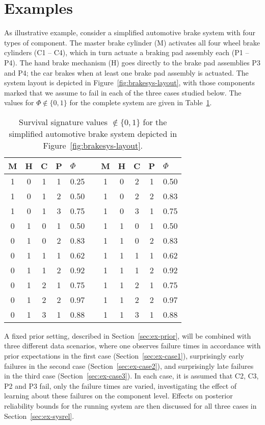 \documentclass[Journal,SectionNumbers,InsideFigs]{ascelike}
\begin{document}
\section{Examples}
\label{sec:examples}

As illustrative example, consider a simplified automotive brake system with four types of component.
The master brake cylinder (M) activates all four wheel brake cylinders (C1 -- C4),
which in turn actuate a braking pad assembly each (P1 -- P4).
The hand brake mechanism (H) goes directly to the brake pad assemblies P3 and P4;
the car brakes when at least one brake pad assembly is actuated.
The system layout is depicted in Figure~\ref{fig:brakesys-layout},
with those components marked that we assume to fail in each of the three cases studied below.
The values for $\Phi \not\in \{0,1\}$ for the complete system are given in Table~\ref{tab:brake-survsign}.

\begin{table}
\centering
\begin{tabular}{cccclcccccl}
  \toprule
M & H & C & P & $\Phi$ & \quad & M & H & C & P & $\Phi$\\ 
  \midrule
1 & 0 & 1 & 1 & 0.25 & & 1 & 0 & 2 & 1 & 0.50 \\ 
1 & 0 & 1 & 2 & 0.50 & & 1 & 0 & 2 & 2 & 0.83 \\ 
1 & 0 & 1 & 3 & 0.75 & & 1 & 0 & 3 & 1 & 0.75 \\ 
0 & 1 & 0 & 1 & 0.50 & & 1 & 1 & 0 & 1 & 0.50 \\ 
0 & 1 & 0 & 2 & 0.83 & & 1 & 1 & 0 & 2 & 0.83 \\ 
0 & 1 & 1 & 1 & 0.62 & & 1 & 1 & 1 & 1 & 0.62 \\ 
0 & 1 & 1 & 2 & 0.92 & & 1 & 1 & 1 & 2 & 0.92 \\ 
0 & 1 & 2 & 1 & 0.75 & & 1 & 1 & 2 & 1 & 0.75 \\ 
0 & 1 & 2 & 2 & 0.97 & & 1 & 1 & 2 & 2 & 0.97 \\ 
0 & 1 & 3 & 1 & 0.88 & & 1 & 1 & 3 & 1 & 0.88 \\ 
   \bottomrule
\end{tabular}
\caption{Survival signature values $\not\in \{0,1\}$ for the simplified automotive brake system depicted in Figure~\ref{fig:brakesys-layout}.}
\label{tab:brake-survsign}
\end{table}

A fixed prior setting, described in Section~\ref{sec:ex-prior},
will be combined with three different data scenarios,
where one observes failure times in accordance with prior expectations in the first case (Section~\ref{sec:ex-case1}),
surprisingly early failures in the second case (Section~\ref{sec:ex-case2}), and
surprisingly late failures in the third case (Section~\ref{sec:ex-case3}).
In each case, it is assumed that C2, C3, P2 and P3 fail, only the failure times are varied,
investigating the effect of learning about these failures on the component level.
Effects on posterior reliability bounds for the running system
are then discussed for all three cases in Section~\ref{sec:ex-sysrel}.
\end{document}

